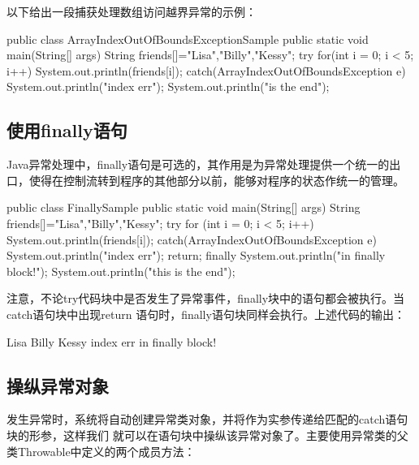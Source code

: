 以下给出一段捕获处理数组访问越界异常的示例：


\begin{javaCode}
public class ArrayIndexOutOfBoundsExceptionSample {
  public static void main(String[] args) {
    String friends[]={"Lisa","Billy","Kessy"};
    try {
      for(int i = 0; i < 5; i++) {
        System.out.println(friends[i]);
      }
    } catch(ArrayIndexOutOfBoundsException e) {
      System.out.println("index err");
    }
    System.out.println("\nthis is the end");
  }
}
\end{javaCode}

\subsection{使用finally语句}

Java异常处理中，finally语句是可选的，其作用是为异常处理提供一个统一的出口，使得在控制流转到程序的其他部分以前，能够对程序的状态作统一的管理。


\begin{javaCode}
public class FinallySample {
  public static void main(String[] args) {
    String friends[]={"Lisa","Billy","Kessy"};
    try {
      for (int i = 0; i < 5; i++) {
        System.out.println(friends[i]);
      }
    } catch(ArrayIndexOutOfBoundsException e) {
      System.out.println("index err");
      return;
    } finally {
      System.out.println("in finally block!");
    }
    System.out.println("this is the end");
  }
}
  
\end{javaCode}

注意，不论try代码块中是否发生了异常事件，finally块中的语句都会被执行。当catch语句块中出现return
语句时，finally语句块同样会执行。上述代码的输出：

\begin{stdoutCode}
Lisa
Billy
Kessy
index err
in finally block!  
\end{stdoutCode}

\subsection{操纵异常对象}

发生异常时，系统将自动创建异常类对象，并将作为实参传递给匹配的catch语句块的形参，这样我们
就可以在语句块中操纵该异常对象了。主要使用异常类的父类Throwable中定义的两个成员方法：

